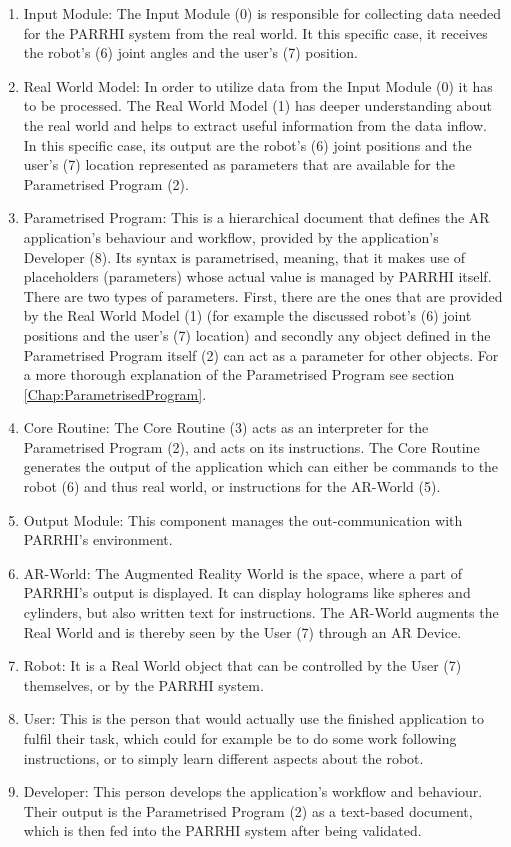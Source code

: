 \begin{enumerate}
	\addtocounter{enumi}{-1}
	\setlength\itemsep{-1em}
	\item Input Module: The Input Module (0) is responsible for collecting data needed for the PARRHI system from the real world. It this specific case, it  receives the robot's (6) joint angles and the user's (7) position.
	\item Real World Model: In order to utilize data from the Input Module (0) it has to be processed. The Real World Model (1) has deeper understanding about the real world and helps to extract useful information from the data inflow. In this specific case, its output are the robot's (6) joint positions and the user's (7) location represented as parameters that are available for the Parametrised Program (2).
	\item Parametrised Program: This is a hierarchical document that defines the AR application's behaviour and workflow, provided by the application's Developer (8). Its syntax is parametrised, meaning, that it makes use of placeholders (parameters) whose actual value is managed by PARRHI itself. There are two types of parameters. First, there are the ones that are provided by the Real World Model (1) (for example the discussed robot's (6) joint positions and the user's (7) location) and secondly any object defined in the Parametrised Program itself (2) can act as a parameter for other objects. For a more thorough explanation of the Parametrised Program see section \ref{Chap:ParametrisedProgram}.
	\item Core Routine: The Core Routine (3) acts as an interpreter for the Parametrised Program (2), and acts on its instructions. The Core Routine generates the output of the application which can either be commands to the robot (6) and thus real world, or instructions for the AR-World (5).
	\item Output Module: This component manages the out-communication with PARRHI's environment. 
	\item AR-World: The Augmented Reality World is the space, where a part of PARRHI's output is displayed. It can display holograms like spheres and cylinders, but also written text for instructions. The AR-World augments the Real World and is thereby seen by the User (7) through an AR Device.
	\item Robot: It is a Real World object that can be controlled by the User (7) themselves, or by the PARRHI system.
	\item User: This is the person that would actually use the finished application to fulfil their task, which could for example be to do some work following instructions, or to simply learn different aspects about the robot.
	\item Developer: This person develops the application's workflow and behaviour. Their output is the Parametrised Program (2) as a text-based document, which is then fed into the PARRHI system after being validated. 
\end{enumerate}

